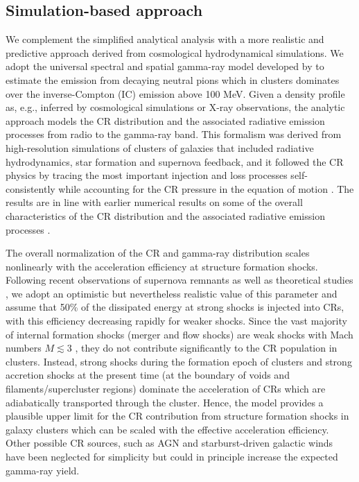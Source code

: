 \documentclass[12pt,manuscript]{aastex}
\begin{document}
\subsection{Simulation-based approach}
\label{sec:simulation}
We complement the simplified analytical analysis with a more realistic and predictive approach
derived from cosmological hydrodynamical simulations. We adopt the universal spectral and spatial
gamma-ray model developed by \citet{article:PinzkePfrommer:2010} to estimate the emission from
decaying neutral pions which in clusters dominates over the inverse-Compton (IC) emission above
100 MeV. Given a density profile as, e.g., inferred by
cosmological simulations or X-ray observations, the analytic approach models the CR distribution and
the associated radiative emission processes from radio to the gamma-ray band. This formalism was
derived from high-resolution simulations of clusters of galaxies that included radiative
hydrodynamics, star formation and supernova feedback, and it followed the CR physics by tracing the
most important injection and loss processes self-consistently while accounting for the CR pressure
in the equation of motion
\citep{article:PfrommerSpringelEnsslinJubelgas, article:EnsslinPfrommerSpringelJubelgas:2007,
article:JubelgasSpringelEnsslinPfrommer:2008}. The results are in line with earlier numerical
results on some of the overall characteristics of the CR distribution and the associated radiative
emission processes \citep{article:DolagEnsslin:2000, article:MiniatiRyuKangJones:2001,
article:Miniati:2003, article:Pfrommer_etal:2007, article:PfrommerEnsslinSpringel:2008,
article:Pfrommer:2008}.
 
The overall normalization of the CR and gamma-ray distribution scales nonlinearly with the
acceleration efficiency at structure formation shocks. Following recent observations of supernova
remnants \citep{article:Helder_etal:2009} as well as theoretical studies
\citep{article:KangJones:2005}, we adopt an optimistic but nevertheless realistic value of this
parameter and assume that 50\% of the dissipated energy at strong shocks is injected into CRs, with
this efficiency decreasing rapidly for weaker shocks. Since the vast majority of internal formation
shocks (merger and flow shocks) are weak shocks with Mach numbers $M\lesssim3$
\citep[e.g.,][]{article:Ryu_etal:2003}, they do not contribute significantly to the CR population in
clusters. Instead, strong shocks during the formation epoch of clusters and strong accretion shocks
at the present time (at the boundary of voids and filaments/supercluster regions) dominate the
acceleration of CRs which are adiabatically transported through the cluster. Hence, the
model provides a plausible upper limit for the CR contribution from structure formation shocks in
galaxy clusters which can be scaled with the effective acceleration efficiency. Other possible CR
sources, such as AGN and starburst-driven galactic winds have been neglected for simplicity but
could in principle increase the expected gamma-ray yield.
\end{document}
